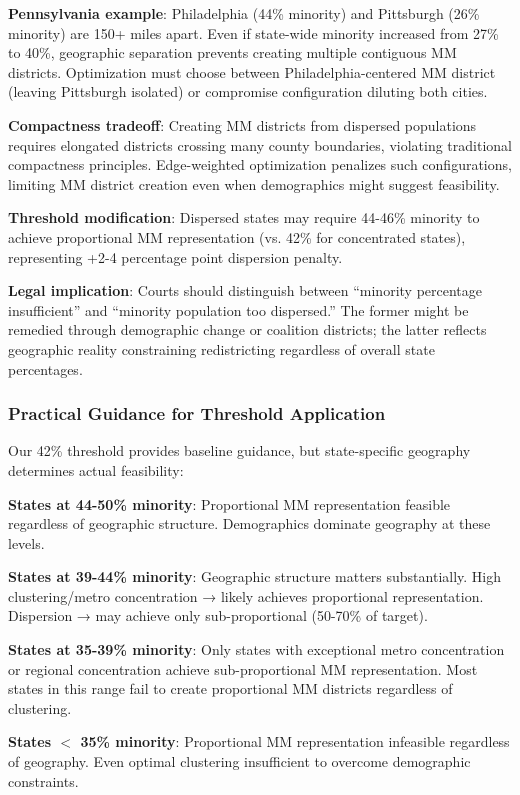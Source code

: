 \textbf{Pennsylvania example}: Philadelphia (44\% minority) and Pittsburgh (26\% minority) are 150+ miles apart. Even if state-wide minority increased from 27\% to 40\%, geographic separation prevents creating multiple contiguous MM districts. Optimization must choose between Philadelphia-centered MM district (leaving Pittsburgh isolated) or compromise configuration diluting both cities.

\textbf{Compactness tradeoff}: Creating MM districts from dispersed populations requires elongated districts crossing many county boundaries, violating traditional compactness principles. Edge-weighted optimization penalizes such configurations, limiting MM district creation even when demographics might suggest feasibility.

\textbf{Threshold modification}: Dispersed states may require 44-46\% minority to achieve proportional MM representation (vs. 42\% for concentrated states), representing +2-4 percentage point dispersion penalty.

\textbf{Legal implication}: Courts should distinguish between ``minority percentage insufficient'' and ``minority population too dispersed.'' The former might be remedied through demographic change or coalition districts; the latter reflects geographic reality constraining redistricting regardless of overall state percentages.

\subsubsection{Practical Guidance for Threshold Application}

Our 42\% threshold provides baseline guidance, but state-specific geography determines actual feasibility:

\textbf{States at 44-50\% minority}: Proportional MM representation feasible regardless of geographic structure. Demographics dominate geography at these levels.

\textbf{States at 39-44\% minority}: Geographic structure matters substantially. High clustering/metro concentration → likely achieves proportional representation. Dispersion → may achieve only sub-proportional (50-70\% of target).

\textbf{States at 35-39\% minority}: Only states with exceptional metro concentration or regional concentration achieve sub-proportional MM representation. Most states in this range fail to create proportional MM districts regardless of clustering.

\textbf{States $<$ 35\% minority}: Proportional MM representation infeasible regardless of geography. Even optimal clustering insufficient to overcome demographic constraints.

